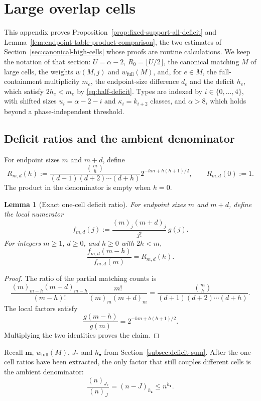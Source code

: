 \documentclass[a4paper,10pt,reqno]{amsart}
\numberwithin{equation}{section}
\theoremstyle{plain}
\newtheorem{lemma}[theorem]{Lemma}
\theoremstyle{remark}
\begin{document}
\section{Large overlap cells}
\label{app:large-cells}

This appendix proves Proposition~\ref{prop:fixed-support-all-deficit} and
Lemma~\ref{lem:endpoint-table-product-comparison}, the two estimates of
Section~\ref{sec:canonical-high-cells} whose proofs are routine
calculations. We keep the notation of that section: $U=\alpha-2$,
$R_0=\lfloor U/2\rfloor$, the canonical matching $M$ of large cells, the
weights $w(M,j)$ and $w_{\mathrm{full}}(M)$, and, for $e\in M$, the
full-containment multiplicity $m_e$, the endpoint-size difference $d_e$ and
the deficit $h_e$, which satisfy $2h_e<m_e$ by \eqref{eq:half-deficit}.
Types are indexed by $i\in\{0,\ldots,4\}$, with shifted sizes
$u_i=\alpha-2-i$ and $\kappa_i=k_{i+2}$ classes, and $\alpha>8$, which holds
beyond a phase-independent threshold.

\subsection{Deficit ratios and the ambient denominator}
\label{app:deficit-ratios}

For endpoint sizes $m$ and $m+d$, define
\begin{equation}
  R_{m,d}(h)
  :=
  \frac{\binom mh}
       {(d+1)(d+2)\cdots(d+h)}
  2^{-hm+h(h+1)/2},
  \qquad
  R_{m,d}(0):=1.
  \label{eq:local-deficit-ratio}
\end{equation}
The product in the denominator is empty when $h=0$.

\begin{lemma}[Exact one-cell deficit ratio]
\label{lem:exact-local-ratio}
For endpoint sizes \(m\) and \(m+d\), define the local numerator
\[
 f_{m,d}(j):=\frac{(m)_j(m+d)_j}{j!}\,g(j).
\]
For integers \(m\ge1\), \(d\ge0\), and \(h\ge0\) with \(2h<m\),
\[
 \frac{f_{m,d}(m-h)}{f_{m,d}(m)}=R_{m,d}(h).
\]
\end{lemma}

\begin{proof}
The ratio of the partial matching counts is
\[
  \frac{(m)_{m-h}(m+d)_{m-h}}{(m-h)!}
  \frac{m!}{(m)_m(m+d)_m}
  =
  \frac{\binom mh}{(d+1)(d+2)\cdots(d+h)}.
\]
The local factors satisfy
\[
  \frac{g(m-h)}{g(m)}
  =
  2^{-hm+h(h+1)/2}.
\]
Multiplying the two identities proves the claim.
\end{proof}

Recall $\mathbf m$, $w_{\mathrm{full}}(M)$, $J_*$ and $h_\bullet$ from
Section~\ref{subsec:deficit-sum}.
After the one-cell ratios have been extracted, the only factor that still
couples different cells is the ambient denominator:
\begin{equation}
  \frac{(n)_{J_*}}{(n)_J}
  =(n-J)_{h_\bullet}
  \le n^{h_\bullet}.
  \label{eq:one-global-falling-factorial}
\end{equation}
\end{document}
